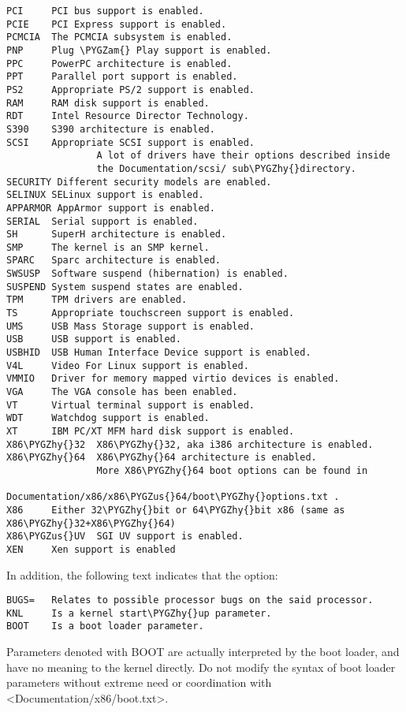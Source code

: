 \documentclass[a4paper,8pt,english]{sphinxmanual}
\def\PYGZus{\char`\_}
\def\PYGZam{\char`\&}
\def\PYGZhy{\char`\-}
\begin{document}
\begin{Verbatim}[commandchars=\\\{\}]
PCI     PCI bus support is enabled.
PCIE    PCI Express support is enabled.
PCMCIA  The PCMCIA subsystem is enabled.
PNP     Plug \PYGZam{} Play support is enabled.
PPC     PowerPC architecture is enabled.
PPT     Parallel port support is enabled.
PS2     Appropriate PS/2 support is enabled.
RAM     RAM disk support is enabled.
RDT     Intel Resource Director Technology.
S390    S390 architecture is enabled.
SCSI    Appropriate SCSI support is enabled.
                A lot of drivers have their options described inside
                the Documentation/scsi/ sub\PYGZhy{}directory.
SECURITY Different security models are enabled.
SELINUX SELinux support is enabled.
APPARMOR AppArmor support is enabled.
SERIAL  Serial support is enabled.
SH      SuperH architecture is enabled.
SMP     The kernel is an SMP kernel.
SPARC   Sparc architecture is enabled.
SWSUSP  Software suspend (hibernation) is enabled.
SUSPEND System suspend states are enabled.
TPM     TPM drivers are enabled.
TS      Appropriate touchscreen support is enabled.
UMS     USB Mass Storage support is enabled.
USB     USB support is enabled.
USBHID  USB Human Interface Device support is enabled.
V4L     Video For Linux support is enabled.
VMMIO   Driver for memory mapped virtio devices is enabled.
VGA     The VGA console has been enabled.
VT      Virtual terminal support is enabled.
WDT     Watchdog support is enabled.
XT      IBM PC/XT MFM hard disk support is enabled.
X86\PYGZhy{}32  X86\PYGZhy{}32, aka i386 architecture is enabled.
X86\PYGZhy{}64  X86\PYGZhy{}64 architecture is enabled.
                More X86\PYGZhy{}64 boot options can be found in
                Documentation/x86/x86\PYGZus{}64/boot\PYGZhy{}options.txt .
X86     Either 32\PYGZhy{}bit or 64\PYGZhy{}bit x86 (same as X86\PYGZhy{}32+X86\PYGZhy{}64)
X86\PYGZus{}UV  SGI UV support is enabled.
XEN     Xen support is enabled
\end{Verbatim}

In addition, the following text indicates that the option:

\begin{Verbatim}[commandchars=\\\{\}]
BUGS=   Relates to possible processor bugs on the said processor.
KNL     Is a kernel start\PYGZhy{}up parameter.
BOOT    Is a boot loader parameter.
\end{Verbatim}

Parameters denoted with BOOT are actually interpreted by the boot
loader, and have no meaning to the kernel directly.
Do not modify the syntax of boot loader parameters without extreme
need or coordination with \textless{}Documentation/x86/boot.txt\textgreater{}.
\end{document}
